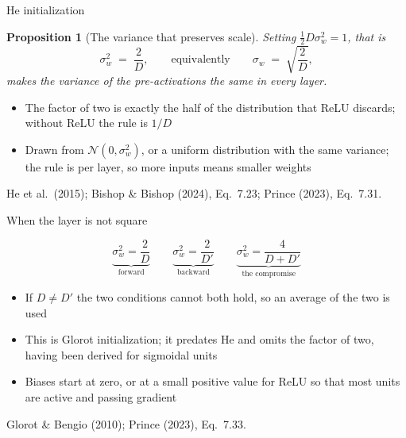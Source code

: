 \documentclass[aspectratio=169, 11pt]{beamer}
\newtheorem{propx}[theorem]{Proposition}
\newcommand{\srcline}[1]{%
  \par\vspace{0.25em}%
  {\scriptsize\color{mcMuted}\hfill #1\par}}
\newcommand{\src}[3]{}      %
\begin{document}
\begin{frame}{He initialization}
  \src{he2015}{equation}{10}
  \src{he2015}{section}{2.2}
  \src{bishop2024}{equation}{7.23}
  \src{bishop2024}{section}{7.2.5}
  \src{prince2023}{equation}{7.31}
  \src{prince2023}{section}{7.5.1}
  \vspace{-0.3em}
  \begin{propx}[The variance that preserves scale]\label{th:he}
    \small
    Setting $\tfrac12 D \sigma_w^2 = 1$, that is
    \[
      \sigma_w^2 \;=\; \frac{2}{D},
      \qquad\text{equivalently}\qquad
      \sigma_w \;=\; \sqrt{\frac{2}{D}} ,
    \]
    makes the variance of the pre-activations the same in every layer.
  \end{propx}
  \vspace{0.25em}
  \begin{itemize}\itemsep0.3em
    \item The factor of two is exactly the half of the distribution that
          ReLU discards; without ReLU the rule is $1/D$
    \item Drawn from $\mathcal{N}(0, \sigma_w^2)$, or a uniform
          distribution with the same variance; the rule is per layer, so
          more inputs means smaller weights
  \end{itemize}
  \srcline{He et al.~(2015); Bishop \& Bishop (2024), Eq.~7.23;
  Prince (2023), Eq.~7.31.}
\end{frame}

\begin{frame}{When the layer is not square}
  \src{glorot2010}{equation}{10-12}
  \src{glorot2010}{section}{4.2.1}
  \src{prince2023}{equation}{7.33}
  \src{prince2023}{section}{7.5.3}
  \src{prince2023}{page}{113}
  \vspace{-0.35em}
  \[
    \underbrace{\sigma_w^2 = \frac{2}{D}}_{\text{forward}}
    \qquad
    \underbrace{\sigma_w^2 = \frac{2}{D'}}_{\text{backward}}
    \qquad
    \underbrace{\sigma_w^2 = \frac{4}{D + D'}}_{\text{the compromise}}
  \]
  \vspace{-0.65em}
  \begin{itemize}\itemsep0.3em
    \item If $D \neq D'$ the two conditions cannot both hold, so an
          average of the two is used
    \item This is \alert{Glorot} initialization; it predates He and
          omits the factor of two, having been derived for sigmoidal
          units
    \item Biases start at zero, or at a small positive value for ReLU so
          that most units are active and passing gradient
  \end{itemize}
  \srcline{Glorot \& Bengio (2010); Prince (2023), Eq.~7.33.}
\end{frame}
\end{document}
